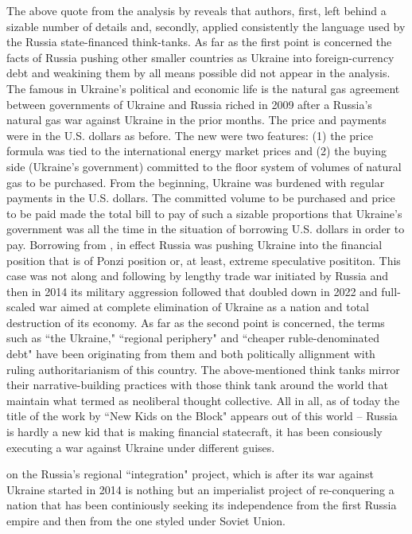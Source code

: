 The above quote from the analysis by \citeauthor{katada2014} reveals that authors, first, left behind a sizable number of details and, secondly, applied consistently the language used by the Russia state-financed think-tanks. As far as the first point is concerned the facts of Russia pushing other smaller countries as Ukraine into foreign-currency debt and weakining them by all means possible did not appear in the analysis. The famous in Ukraine's political and economic life is the natural gas agreement between governments of Ukraine and Russia riched in 2009 after a Russia's natural gas war against Ukraine in the prior months. The price and payments were in the U.S. dollars as before. The new were two features: (1) the price formula was tied to the international energy market prices and (2) the buying side (Ukraine's government) committed to the floor system of volumes of natural gas to be purchased. From the beginning, Ukraine was burdened with regular payments in the U.S. dollars. The committed volume to be purchased and price to be paid made the total bill to pay of such a sizable proportions that Ukraine's government was all the time in the situation of borrowing U.S. dollars in order to pay. Borrowing from \citeauthor{kregel2019}, in effect Russia was pushing Ukraine into the financial position that is of Ponzi position or, at least, extreme speculative posititon. This case was not along and following by lengthy trade war initiated by Russia and then in 2014 its military aggression followed that doubled down in 2022 and full-scaled war aimed at complete elimination of Ukraine as a nation and total destruction of its economy. As far as the second point is concerned, the terms such as ``the Ukraine," ``regional periphery" and ``cheaper ruble-denominated debt" have been originating from them and both politically allignment with ruling authoritarianism of this country. The above-mentioned think tanks mirror their narrative-building practices with those think tank around the world that maintain what  termed as neoliberal thought collective. All in all, as of today the title of the work by \citeauthor{katada2014} ``New Kids on the Block" appears out of this world -- Russia is hardly a new kid that is making financial statecraft, it has been consiously executing a war against Ukraine under different guises.  

\cite{hancock2009} on the Russia's regional ``integration" project, which is after its war against Ukraine started in 2014 is nothing but an imperialist project of re-conquering a nation that has been continiously seeking its independence from the first Russia empire and then from the one styled under Soviet Union.

